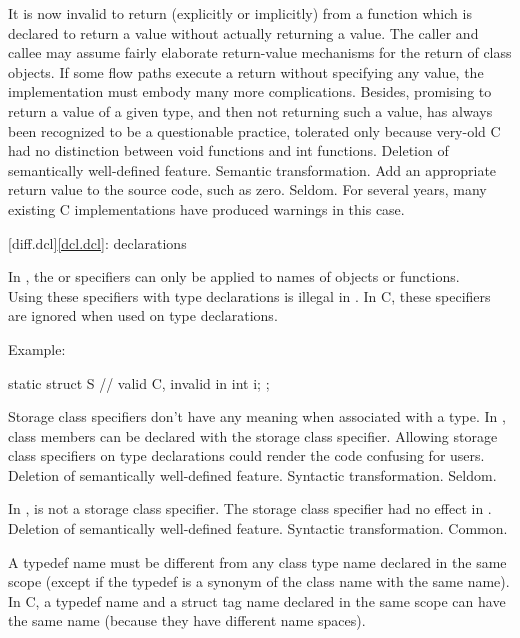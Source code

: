 \change It is now invalid to return (explicitly or implicitly) from a function which is
declared to return a value without actually returning a value.
\rationale
The caller and callee may assume fairly elaborate
return-value mechanisms for the return of class objects.
If
some flow paths execute a return without specifying any value,
the implementation must embody many more complications.
Besides,
promising to return a value of a given type, and then not returning
such a value, has always been recognized to be a questionable
practice, tolerated only because very-old C had no distinction between
void  functions and  int  functions.
\effect
Deletion of semantically well-defined feature.
\difficulty
Semantic transformation.
Add an appropriate return value to the source code, such as zero.
\howwide
Seldom.
For several years, many existing C implementations have produced warnings in
this case.

[diff.dcl]{\ref{dcl.dcl}: declarations}

\change In \Cpp{}, the  or  specifiers can only be applied to names of objects or functions.\\
Using these specifiers with type declarations is illegal in \Cpp{}.
In C, these specifiers are ignored when used on type declarations.

Example:

\begin{codeblock}
static struct S {               // valid C, invalid in \Cpp{}
  int i;
};
\end{codeblock}

\rationale
Storage class specifiers don't have any meaning when associated
with a type.
In \Cpp{}, class members can be declared with the  storage
class specifier.
Allowing storage class specifiers on type
declarations could render the code confusing for users.
\effect
Deletion of semantically well-defined feature.
\difficulty
Syntactic transformation.
\howwide
Seldom.

\change In \Cpp{},  is not a storage class specifier.
\rationale
The storage class specifier had no effect in \Cpp{}.
\effect
Deletion of semantically well-defined feature.
\difficulty
Syntactic transformation.
\howwide
Common.

\change A \Cpp{} typedef name must be different from any class type name declared
in the same scope (except if the typedef is a synonym of the class name with the
same name). In C, a typedef name and a struct tag name declared in the same scope
can have the same name (because they have different name spaces).

